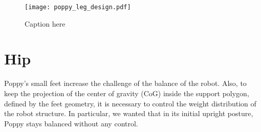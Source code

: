 \begin{figure}[p]
    \begin{center}
        \texttt{[image: poppy\_leg\_design.pdf]}
    \end{center}
    \caption{Caption here}
    \label{fig:figure1}
\end{figure}














\section{Hip} %
\label{sec:hip}


Poppy's small feet increase the challenge of the balance of the robot. Also, to keep the projection of the center of gravity (CoG) inside the support polygon, defined by the feet geometry, it is necessary to control the weight distribution of the robot structure. In particular, we wanted that in its initial upright posture, Poppy stays balanced without any control.

